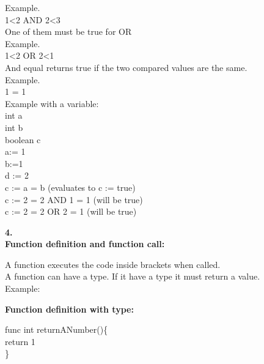 Example.\\
1<2 AND 2<3\\
One of them must be true for OR\\
Example.\\
1<2 OR 2<1\\
And equal returns true if the two compared values are the same.\\
Example.\\
1 = 1\\
Example with a variable:\\
int a\\
int b\\
boolean c\\
a:= 1\\
b:=1\\
d := 2\\
c :=  a = b (evaluates to c := true)\\
c := 2 = 2 AND 1 = 1   (will be true)\\
c := 2 = 2 OR 2 = 1    (will be true)
\begin{flushleft}
\textbf{4.}\\
\textbf{Function definition and function call:}
\end{flushleft}
  A function executes the code inside {} brackets when called.\\
  A function can have a type. If it have a type it must return a value.\\
  Example:
 \begin{flushleft}
 \textbf{Function definition with type:}
 \end{flushleft}
func int returnANumber()\{\\
\hspace*{12mm}	return 1\\
\}

